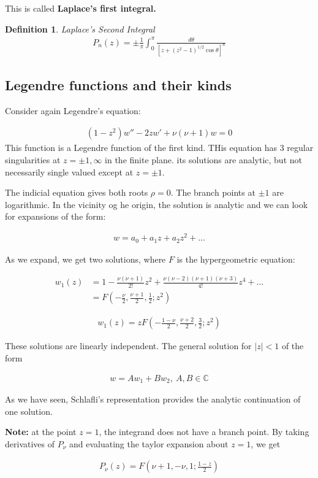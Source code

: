 \documentclass{article}
\theoremstyle{definition}
\newtheorem{definition}{Definition}[section]
\newcommand{\Def}[2]{
\begin{shaded*}
\begin{definition}{\textit{#1}}\\#2\end{definition}
\end{shaded*}
}
\def\C{\mathbb{C}}
\newcommand{\eq}[1]{\begin{align*}
	#1
	\end{align*}}
\begin{document}
This is called \textbf{Laplace's first integral.}

\Def{Laplace's Second Integral}{
\begin{align*}
P_n(z) = \pm \frac{1}{\pi} \int_{0}^\pi \frac{d\theta}{ [z +(z^2-1)^{1/2} \cos \theta ]^n }
\end{align*}
}

\subsection{Legendre functions and their kinds}

Consider again Legendre's equation:

\eq{(1-z^2)w'' - 2zw' + \nu(\nu +1)w = 0}
This function is a Legendre function of the first kind. THis equation has 3 regular singularities at $z=\pm1, \infty$ in the finite plane. its solutions are analytic, but not necessarily single valued except at $z=\pm 1$.

The indicial equation gives both roots $\rho = 0$. The branch points at $\pm 1$ are logarithmic. In the vicinity og he origin, the solution is analytic and we can look for expansions of the form:

\eq{w = a_0 + a_1 z + a_2z^2+...}

As we expand, we get two solutions, where $F$ is the hypergeometric equation:

\begin{align*}
w_1(z) &= 1-\frac{\nu(\nu+1)}{2!}z^2 + \frac{\nu (\nu-2) (\nu+1) (\nu+3)}{4!}z^4+... \\ 
&= F(-\frac{\nu}{2}, \frac{\nu+1}{2}, \frac{1}{2}; z^2)
\end{align*}

\begin{align*}
w_1(z) = zF(-\frac{1-\nu}{2}, \frac{\nu+2}{2}, \frac{3}{2}; z^2)
\end{align*}

These solutions are linearly independent. The general solution for $|z|<1$ of the form 

\eq{w = A w_1 + B w_2,\ A,B\in \C}

As we have seen, Schlafli's representation provides the analytic continuation of one solution. 

\textbf{Note:} at the point $z=1$, the integrand does not have a branch point. By taking derivatives of $P_\nu$ and evaluating the taylor expansion about $z=1$, we get 

\begin{align*}
P_\nu(z) = F(\nu+1, -\nu, 1; \frac{1-z}{2})
\end{align*}
\end{document}
